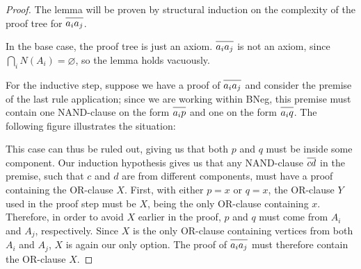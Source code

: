 \begin{proof}
  The lemma will be proven by structural induction on the complexity of the proof tree for $\ol{a_ia_j}$.

  In the base case, the proof tree is just an axiom.
  $\ol{a_ia_j}$ is not an axiom, since $\bigcap_i N(A_i) = \varnothing$, so the lemma holds vacuously.

  For the inductive step, suppose we have a proof of $\ol{a_ia_j}$ and consider the premise of the last rule application;
  since we are working within BNeg, this premise must contain one NAND-clause on the form $\ol{a_ip}$ and one on the form $\ol{a_iq}$.
  The following figure illustrates the situation:\par
  \begin{figure}[!h]
    \centering
    \begin{prooftree*}
      \Hypo{\dots}
      \Hypo{\dots}
      \Hypo{\dots}
    \end{prooftree*}
    \caption{}
    \label{fig:ab_proof_bc}
  \end{figure}
  \FloatBarrier
  This case can thus be ruled out, giving us that both $p$ and $q$ must be inside some component.
  Our induction hypothesis gives us that any NAND-clause $\ol{cd}$ in the premise, such that $c$ and $d$ are from different components, must have a proof containing the OR-clause $X$.
  First, with either $p = x$ or $q = x$, the OR-clause $Y$ used in the proof step must be $X$, being the only OR-clause containing $x$.
  Therefore, in order to avoid $X$ earlier in the proof, $p$ and $q$ must come from $A_i$ and $A_j$, respectively.
  Since $X$ is the only OR-clause containing vertices from both $A_i$ and $A_j$, $X$ is again our only option.
  The proof of $\ol{a_ia_j}$ must therefore contain the OR-clause $X$.
\end{proof}
